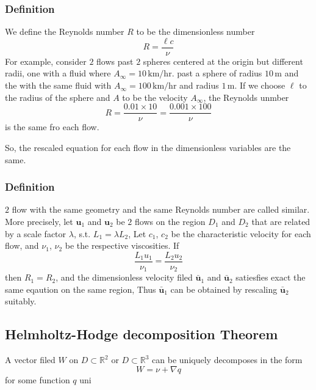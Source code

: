 \subsubsection{Definition} %

We define the Reynolds number $R$ to be the dimensionless number 
\begin{equation}
R = \frac{\ell c}{\nu}
\end{equation}
For example, consider $2$ flows past $2$ spheres centered at the origin but different radii, one with a fluid where $A_{\infty} = 10\,\mathrm{km/hr}$. past a sphere of radius $10\,\mathrm{m}$ and the with the same fluid with $A_{\infty} = 100\,\mathrm{km/hr}$ and radius $1\,\mathrm{m}$. If we choose $\ell$ to the radius of the sphere and $A$ to be the velocity $A_{\infty}$, the Reynolds unmber 
\begin{equation}
R = \frac{0.01\times 10}{\nu} = \frac{0.001\times 100}{\nu}
\end{equation}
is the same fro each flow.

So, the rescaled equation for each flow in the dimensionless variables are the same.

\subsubsection{Definition} %

$2$ flow with the same geometry and the same Reynolds number are called similar. More precisely, let $\textbf{u}_1$ and $\textbf{u}_2$ be $2$ flows on the region $D_1$ and $D_2$ that are related by a scale factor $\lambda$, s.t. $L_1 = \lambda L_2$, Let $c_1$, $c_2$ be the characteristic velocity for each flow, and $\nu_1$, $\nu_2$ be the respective viscosities. If
\begin{equation}
\frac{L_1u_1}{\nu_1} =\frac{L_2u_2}{\nu_2}
\end{equation}
then $R_1 = R_2$, and the dimensionless velocity filed $\bar{\textbf{u}}_1$ and $\bar{\textbf{u}}_2$ satiesfies exact the same eqaution on the same region, Thus $\bar{\textbf{u}}_1$ can be obtained by rescaling $\bar{\textbf{u}}_2$ suitably.

\subsection{Helmholtz-Hodge decomposition Theorem} %

A vector filed $W$ on $D\subset \mathbb{R}^2$ or $D\subset \mathbb{R}^3$ can be uniquely decomposes in the form 
\begin{equation}
W = \nu + \nabla q
\end{equation}
for some function $q$ uni
